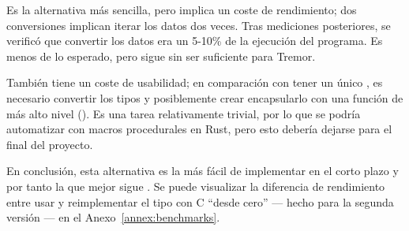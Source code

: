 Es la alternativa más sencilla, pero implica un coste de rendimiento; dos
conversiones implican iterar los datos dos veces. Tras mediciones posteriores,
se verificó que convertir los datos era un 5-10\% de la ejecución del programa.
Es menos de lo esperado, pero sigue sin ser suficiente para Tremor.

También tiene un coste de usabilidad; en comparación con tener un único
, es necesario convertir los tipos y posiblemente crear encapsularlo
con una función de más alto nivel (). Es una tarea
relativamente trivial, por lo que se podría automatizar con macros procedurales
en Rust, pero esto debería dejarse para el final del proyecto.

En conclusión, esta alternativa es la más fácil de implementar en el corto plazo
y por tanto la que mejor sigue \work. Se puede visualizar la diferencia de
rendimiento entre usar  y reimplementar el tipo con C ``desde
cero'' --- hecho para la segunda versión --- en el Anexo~\ref{annex:benchmarks}.
